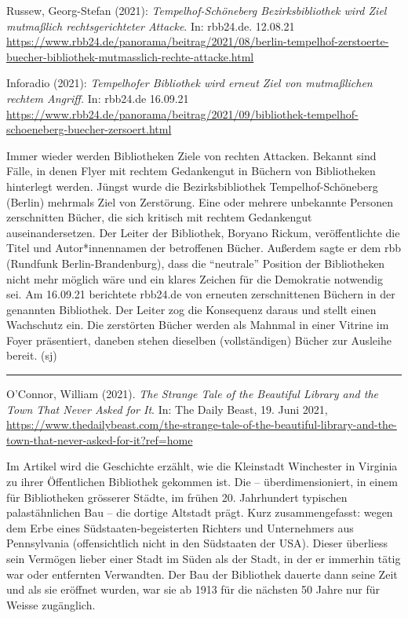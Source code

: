 \documentclass[a4paper,
fontsize=11pt,
oneside,
numbers=noperiodatend,
parskip=half-,
bibliography=totoc,
final
]{scrartcl}
\begin{document}
Russew, Georg-Stefan (2021): \emph{Tempelhof-Schöneberg
Bezirksbibliothek wird Ziel mutmaßlich rechtsgerichteter Attacke}. In:
rbb24.de. 12.08.21
\url{https://www.rbb24.de/panorama/beitrag/2021/08/berlin-tempelhof-zerstoerte-buecher-bibliothek-mutmasslich-rechte-attacke.html}

Inforadio (2021): \emph{Tempelhofer Bibliothek wird erneut Ziel von
mutmaßlichen rechtem Angriff.} In: rbb24.de 16.09.21
\url{https://www.rbb24.de/panorama/beitrag/2021/09/bibliothek-tempelhof-schoeneberg-buecher-zersoert.html}

Immer wieder werden Bibliotheken Ziele von rechten Attacken. Bekannt
sind Fälle, in denen Flyer mit rechtem Gedankengut in Büchern von
Bibliotheken hinterlegt werden. Jüngst wurde die Bezirksbibliothek
Tempelhof-Schöneberg (Berlin) mehrmals Ziel von Zerstörung. Eine oder
mehrere unbekannte Personen zerschnitten Bücher, die sich kritisch mit
rechtem Gedankengut auseinandersetzen. Der Leiter der Bibliothek,
Boryano Rickum, veröffentlichte die Titel und Autor*innennamen der
betroffenen Bücher. Außerdem sagte er dem rbb (Rundfunk
Berlin-Brandenburg), dass die \enquote{neutrale} Position der Bibliotheken
nicht mehr möglich wäre und ein klares Zeichen für die Demokratie
notwendig sei. Am 16.09.21 berichtete rbb24.de von erneuten
zerschnittenen Büchern in der genannten Bibliothek. Der Leiter zog die
Konsequenz daraus und stellt einen Wachschutz ein. Die zerstörten Bücher
werden als Mahnmal in einer Vitrine im Foyer präsentiert, daneben stehen
dieselben (vollständigen) Bücher zur Ausleihe bereit. (sj)

\begin{center}\rule{0.5\linewidth}{0.5pt}\end{center}

O'Connor, William (2021). \emph{The Strange Tale of the Beautiful
Library and the Town That Never Asked for It}. In: The Daily Beast, 19.
Juni 2021,
\url{https://www.thedailybeast.com/the-strange-tale-of-the-beautiful-library-and-the-town-that-never-asked-for-it?ref=home}

Im Artikel wird die Geschichte erzählt, wie die Kleinstadt Winchester in
Virginia zu ihrer Öffentlichen Bibliothek gekommen ist. Die --
überdimensioniert, in einem für Bibliotheken grösserer Städte, im frühen
20. Jahrhundert typischen palastähnlichen Bau -- die dortige Altstadt
prägt. Kurz zusammengefasst: wegen dem Erbe eines
Südstaaten-begeisterten Richters und Unternehmers aus Pennsylvania
(offensichtlich nicht in den Südstaaten der USA). Dieser überliess sein
Vermögen lieber einer Stadt im Süden als der Stadt, in der er immerhin
tätig war oder entfernten Verwandten. Der Bau der Bibliothek dauerte
dann seine Zeit und als sie eröffnet wurden, war sie ab 1913 für die
nächsten 50 Jahre nur für Weisse zugänglich.
\end{document}
